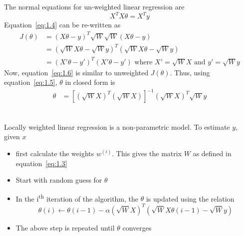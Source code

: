 \documentclass{article}
\begin{document}
\subsection{}
The normal equations for un-weighted linear regression are
\begin{equation}
  \label{eq:1.5}
  X^T X \theta = X^T y
\end{equation}
Equation~\ref{eq:1.4} can be re-written as
\begin{equation}
  \label{eq:1.6}
  \begin{split}
    J(\theta) &= (X\theta - y)^T \sqrt{W}\sqrt{W} (X\theta - y)     \\
    &= (\sqrt{W}X\theta - \sqrt{W}y)^T (\sqrt{W}X\theta - \sqrt{W}y) \\
    &= (X'\theta - y')^T(X'\theta - y') \text{ where } X' = \sqrt{W}X \text{ and } y' = \sqrt{W}y
  \end{split}
\end{equation}
Now, equation~\ref{eq:1.6} is similar to unweighted $J(\theta)$. Thus, using equation~\ref{eq:1.5}, $\theta$ in closed form is
\begin{equation}
  \label{eq:1.7}
  \begin{split}
    \theta &= \left[(\sqrt{W}X)^T(\sqrt{W}X)\right]^{-1} \left(\sqrt{W}X\right)^T \sqrt{W}y \\
  \end{split}
\end{equation}

\subsection{}
Locally weighted linear regression is a non-parametric model.
To estimate $y$, given $x$

\begin{itemize}
\item first calculate the weights $w^{(i)}$. This gives the matrix $W$ as defined in equation~\ref{eq:1.3}
\item Start with random guess for $\theta$
  \item In the i\textsuperscript{th} iteration of the algorithm, the $\theta$ is updated using the relation
    \begin{equation}
      \label{eq:1.8}
      \theta(i) \leftarrow \theta(i-1) - \alpha \left(\sqrt{W}X\right)^T \left(\sqrt{W}X\theta(i-1) - \sqrt{W}y\right)
    \end{equation}
\item The above step is repeated until $\theta$ converges
\end{itemize}
\end{document}
